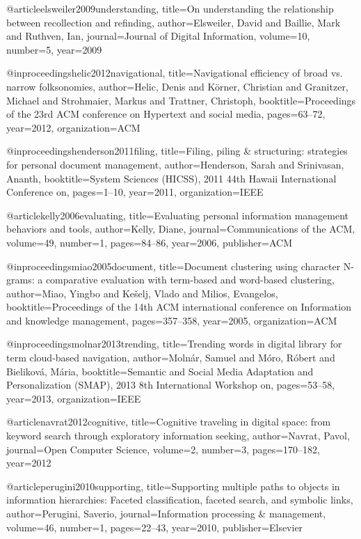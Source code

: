 @article{elsweiler2009understanding,
  title={On understanding the relationship between recollection and refinding},
  author={Elsweiler, David and Baillie, Mark and Ruthven, Ian},
  journal={Journal of Digital Information},
  volume={10},
  number={5},
  year={2009}
}

@inproceedings{helic2012navigational,
  title={Navigational efficiency of broad vs. narrow folksonomies},
  author={Helic, Denis and K{\"o}rner, Christian and Granitzer, Michael and Strohmaier, Markus and Trattner, Christoph},
  booktitle={Proceedings of the 23rd ACM conference on Hypertext and social media},
  pages={63--72},
  year={2012},
  organization={ACM}
}

@inproceedings{henderson2011filing,
  title={Filing, piling \& structuring: strategies for personal document management},
  author={Henderson, Sarah and Srinivasan, Ananth},
  booktitle={System Sciences (HICSS), 2011 44th Hawaii International Conference on},
  pages={1--10},
  year={2011},
  organization={IEEE}
}


@article{kelly2006evaluating,
  title={Evaluating personal information management behaviors and tools},
  author={Kelly, Diane},
  journal={Communications of the ACM},
  volume={49},
  number={1},
  pages={84--86},
  year={2006},
  publisher={ACM}
}

@inproceedings{miao2005document,
  title={Document clustering using character N-grams: a comparative evaluation with term-based and word-based clustering},
  author={Miao, Yingbo and Ke{\v{s}}elj, Vlado and Milios, Evangelos},
  booktitle={Proceedings of the 14th ACM international conference on Information and knowledge management},
  pages={357--358},
  year={2005},
  organization={ACM}
}

@inproceedings{molnar2013trending,
  title={Trending words in digital library for term cloud-based navigation},
  author={Moln{\'a}r, Samuel and M{\'o}ro, R{\'o}bert and Bielikov{\'a}, M{\'a}ria},
  booktitle={Semantic and Social Media Adaptation and Personalization (SMAP), 2013 8th International Workshop on},
  pages={53--58},
  year={2013},
  organization={IEEE}
}

@article{navrat2012cognitive,
  title={Cognitive traveling in digital space: from keyword search through exploratory information seeking},
  author={Navrat, Pavol},
  journal={Open Computer Science},
  volume={2},
  number={3},
  pages={170--182},
  year={2012}
}


@article{perugini2010supporting,
  title={Supporting multiple paths to objects in information hierarchies: Faceted classification, faceted search, and symbolic links},
  author={Perugini, Saverio},
  journal={Information processing \& management},
  volume={46},
  number={1},
  pages={22--43},
  year={2010},
  publisher={Elsevier}
}

